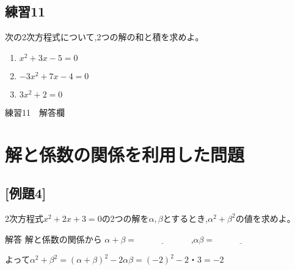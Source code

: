 \documentclass{jsarticle}
\begin{document}
\subsection*{練習11}
次の2次方程式について,2つの解の和と積を求めよ。
\renewcommand{\labelenumi}{(\arabic{enumi})}
\begin{enumerate}
  \item 
    $x^2+3x-5=0$
  \item
    $-3x^2+7x-4=0$
  \item
    $3x^2+2=0$
\end{enumerate}
\begin{itembox}[l]{練習11　解答欄}
  \vspace{40mm}
\end{itembox}
\section*{解と係数の関係を利用した問題}
\subsection*{[例題4]}
2次方程式$x^2+2x+3=0$の2つの解を$\alpha,\beta$とするとき,$\alpha ^2+\beta ^2$の値を求めよ。
\begin{itembox}[l]{解答}
  解と係数の関係から $\alpha+\beta = \underline{\hspace{6em}}$ ,$\alpha\beta = \underline{\hspace{6em}}$\par
  \vspace{3mm}
  よって\qquad$\alpha^2+\beta^2=(\alpha+\beta)^2-2\alpha\beta=(-2)^2-2・3=-2$
\end{itembox}
\end{document}
